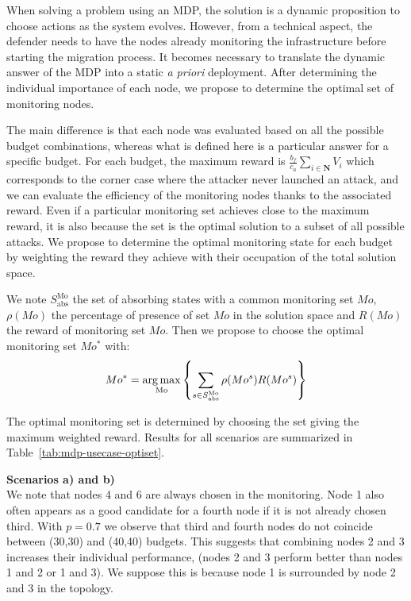When solving a problem using an MDP, the solution is a dynamic proposition to choose actions as the system evolves.
However, from a technical aspect, the defender needs to have the nodes already monitoring the infrastructure before starting the migration process.
It becomes necessary to translate the dynamic answer of the MDP into a static \textit{a priori} deployment.
After determining the individual importance of each node, we propose to determine the optimal set of monitoring nodes.

The main difference is that each node was evaluated based on all the possible budget combinations, whereas what is defined here is a particular answer for a specific budget.
For each budget, the maximum reward is $\frac{b_f}{c_a} \sum\limits_{i \in \textbf{N}}V_i $ which corresponds to the corner case where the attacker never launched an attack, and we can evaluate the efficiency of the   monitoring nodes thanks to the associated reward.
Even if a particular monitoring set achieves close to the maximum reward, it is also because the set is the optimal solution to a subset of all possible attacks.
We propose to determine the optimal monitoring state for each budget by weighting the reward they achieve with their occupation of the total solution space.

We note $S^{\text{Mo}}_{\text{abs}}$ the set of absorbing states with a common  monitoring set $Mo$, $\rho(Mo)$ the percentage of presence of set $Mo$ in the solution space and $R(Mo)$ the reward of monitoring set $Mo$.
Then we propose to choose the optimal monitoring set $Mo^*$ with:
\begin{equation}
    Mo^* = \operatorname*{arg\,max}\limits_{\text{Mo}} \left \{\sum\limits_{s \in S^{\text{Mo}}_{\text{abs}}}\rho(Mo^s)R(Mo^s) \right \}
\end{equation}

The optimal monitoring set is determined by choosing the set giving the maximum weighted reward.
Results for all scenarios are summarized in Table~\ref{tab:mdp-usecase-optiset}.



\textbf{Scenarios a) and b)\\}
We note that nodes 4 and 6 are always chosen in the monitoring.
Node 1 also often appears as a good candidate for a fourth node if it is not already chosen third.
With $p=0.7$ we observe that third and fourth nodes do not coincide between (30,30) and (40,40) budgets.
This suggests that combining nodes 2 and 3 increases their individual performance, (\ie nodes 2 and 3 perform better than nodes 1 and 2 or 1 and 3).
We suppose this is because node 1 is surrounded by node 2 and 3 in the topology.

